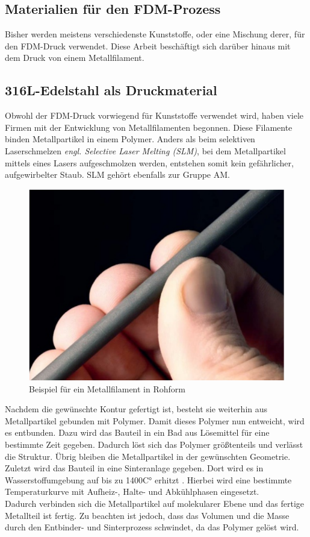 \subsection{Materialien für den FDM-Prozess}

Bisher werden meistens verschiedenste Kunststoffe, oder eine Mischung derer, für den FDM-Druck verwendet. Diese Arbeit beschäftigt sich darüber hinaus mit dem Druck von einem Metallfilament.

\subsection{316L-Edelstahl als Druckmaterial}

Obwohl der FDM-Druck vorwiegend für Kunststoffe verwendet wird, haben viele Firmen mit der Entwicklung von Metallfilamenten begonnen. Diese Filamente binden Metallpartikel in einem Polymer. Anders als beim selektiven Laserschmelzen \textit{engl. Selective Laser Melting (SLM)}, bei dem Metallpartikel mittels eines Lasers aufgeschmolzen werden, entstehen somit kein gefährlicher, aufgewirbelter Staub. SLM gehört ebenfalls zur Gruppe AM. \autocite{MetalAdditiveMan}
\begin{figure}[h]
	\centering
	\includegraphics[width=0.5\linewidth]{bilder/Beispiel_Metallfilament.png}
        \caption[Beispiel für ein Metallfilament in Rohform] {Beispiel für ein Metallfilament in Rohform \autocite{MetalAdditiveMan}}
	\label{fig:FilamentBeispiel}
\end{figure}

Nachdem die gewünschte Kontur gefertigt ist, besteht sie weiterhin aus Metallpartikel gebunden mit Polymer. Damit dieses Polymer nun entweicht, wird es entbunden. Dazu wird das Bauteil in ein Bad aus Lösemittel für eine bestimmte Zeit gegeben. Dadurch löst sich das Polymer größtenteils und verlässt die Struktur. Übrig bleiben die Metallpartikel in der gewünschten Geometrie. Zuletzt wird das Bauteil in eine Sinteranlage gegeben. Dort wird es in Wasserstoffumgebung auf bis zu 1400C° erhitzt . Hierbei wird eine bestimmte Temperaturkurve mit Aufheiz-, Halte- und Abkühlphasen eingesetzt.\\
Dadurch verbinden sich die Metallpartikel auf molekularer Ebene und das fertige Metallteil ist fertig. Zu beachten ist jedoch, dass das Volumen und die Masse durch den Entbinder- und Sinterprozess schwindet, da das Polymer gelöst wird. \autocite{MetalAdditiveMan}

